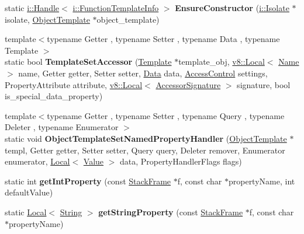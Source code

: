 \begin{DoxyCompactItemize}
\item 
static \hyperlink{classv8_1_1internal_1_1_handle}{i\+::\+Handle}$<$ \hyperlink{classv8_1_1internal_1_1_function_template_info}{i\+::\+Function\+Template\+Info} $>$ {\bfseries Ensure\+Constructor} (\hyperlink{classv8_1_1internal_1_1_isolate}{i\+::\+Isolate} $\ast$isolate, \hyperlink{classv8_1_1_object_template}{Object\+Template} $\ast$object\+\_\+template)\hypertarget{namespacev8_a516d1eeb24b7b799190aecbd8ea149fc}{}\label{namespacev8_a516d1eeb24b7b799190aecbd8ea149fc}

\item 
{\footnotesize template$<$typename Getter , typename Setter , typename Data , typename Template $>$ }\\static bool {\bfseries Template\+Set\+Accessor} (\hyperlink{classv8_1_1_template}{Template} $\ast$template\+\_\+obj, \hyperlink{classv8_1_1_local}{v8\+::\+Local}$<$ \hyperlink{classv8_1_1_name}{Name} $>$ name, Getter getter, Setter setter, \hyperlink{classv8_1_1_data}{Data} data, \hyperlink{namespacev8_a31d8355cb043d7d2dda3f4a52760b64e}{Access\+Control} settings, Property\+Attribute attribute, \hyperlink{classv8_1_1_local}{v8\+::\+Local}$<$ \hyperlink{classv8_1_1_accessor_signature}{Accessor\+Signature} $>$ signature, bool is\+\_\+special\+\_\+data\+\_\+property)\hypertarget{namespacev8_a389f0e7aaf227f19148084a46963a15f}{}\label{namespacev8_a389f0e7aaf227f19148084a46963a15f}

\item 
{\footnotesize template$<$typename Getter , typename Setter , typename Query , typename Deleter , typename Enumerator $>$ }\\static void {\bfseries Object\+Template\+Set\+Named\+Property\+Handler} (\hyperlink{classv8_1_1_object_template}{Object\+Template} $\ast$templ, Getter getter, Setter setter, Query query, Deleter remover, Enumerator enumerator, \hyperlink{classv8_1_1_local}{Local}$<$ \hyperlink{classv8_1_1_value}{Value} $>$ data, Property\+Handler\+Flags flags)\hypertarget{namespacev8_a4d45d314a06ad14783a4fa35dab97a3c}{}\label{namespacev8_a4d45d314a06ad14783a4fa35dab97a3c}

\item 
static int {\bfseries get\+Int\+Property} (const \hyperlink{classv8_1_1_stack_frame}{Stack\+Frame} $\ast$f, const char $\ast$property\+Name, int default\+Value)\hypertarget{namespacev8_af8d04ecde3a076ad3ba79c8f561d72da}{}\label{namespacev8_af8d04ecde3a076ad3ba79c8f561d72da}

\item 
static \hyperlink{classv8_1_1_local}{Local}$<$ \hyperlink{classv8_1_1_string}{String} $>$ {\bfseries get\+String\+Property} (const \hyperlink{classv8_1_1_stack_frame}{Stack\+Frame} $\ast$f, const char $\ast$property\+Name)\hypertarget{namespacev8_a4c6906159668393c6ad98d9fe274e467}{}\label{namespacev8_a4c6906159668393c6ad98d9fe274e467}


\end{DoxyCompactItemize}
